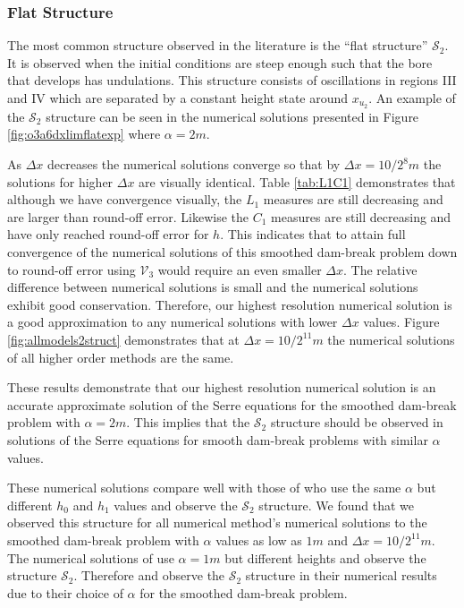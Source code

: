 \documentclass[times]{elsarticle}
\begin{document}
\subsubsection{Flat Structure}
The most common structure observed in the literature \cite{Hank-etal-2010-2034,Mitsotakis-etal-2014,Mitsotakis-etal-2017} is the ``flat structure'' $\mathcal{S}_2$. It is observed when the initial conditions are steep enough such that the bore that develops has undulations. This structure consists of oscillations in regions III and IV which are separated by a constant height state around $x_{u_2}$. An example of the $\mathcal{S}_2$ structure can be seen in the numerical solutions presented in Figure \ref{fig:o3a6dxlimflatexp} where $\alpha = 2m$.

As $\Delta x$ decreases the numerical solutions converge so that by $\Delta x = 10 / 2^8m$ the solutions for higher $\Delta x$ are visually identical. Table \ref{tab:L1C1} demonstrates that although we have convergence visually, the $L_1$ measures are still decreasing and are larger than round-off error. Likewise the $C_1$ measures are still decreasing and have only reached round-off error for $h$. This indicates that to attain full convergence of the numerical solutions of this smoothed dam-break problem down to round-off error using $\mathcal{V}_3$ would require an even smaller $\Delta x$. The relative difference between numerical solutions is small and the numerical solutions exhibit good conservation. Therefore, our highest resolution numerical solution is a good approximation to any numerical solutions with lower $\Delta x$ values. Figure \ref{fig:allmodels2struct} demonstrates that at $\Delta x = 10 / 2^{11}m$ the numerical solutions of all higher order methods are the same.

These results demonstrate that our highest resolution numerical solution is an accurate approximate solution of the Serre equations for the smoothed dam-break problem with $\alpha = 2m$. This implies that the $\mathcal{S}_2$ structure should be observed in solutions of the Serre equations for smooth dam-break problems with similar $\alpha$ values.

These numerical solutions compare well with those of \citet{Mitsotakis-etal-2014} who use the same $\alpha$ but different $h_0$ and $h_1$ values and observe the $\mathcal{S}_2$ structure. We found that we observed this structure for all numerical method's numerical solutions to the smoothed dam-break problem with $\alpha$ values as low as $1m$ and $\Delta x = 10/2^{11}m$. The numerical solutions of \citet{Mitsotakis-etal-2017} use $\alpha=1m$ but different heights and observe the structure $\mathcal{S}_2$. Therefore \citet{Mitsotakis-etal-2017} and \citet{Mitsotakis-etal-2014} observe the $\mathcal{S}_2$ structure in their numerical results due to their choice of $\alpha$ for the smoothed dam-break problem. 
\end{document}

